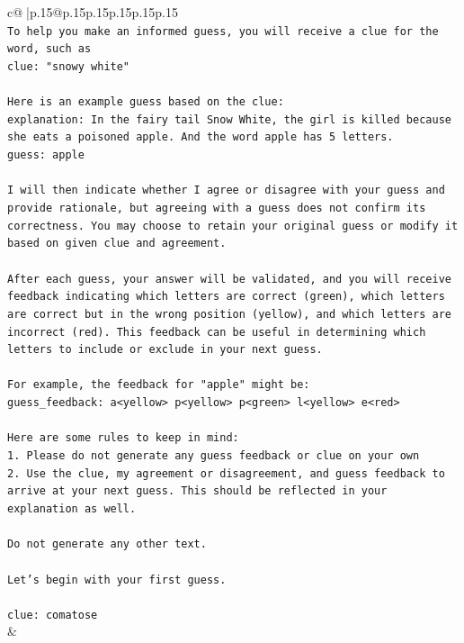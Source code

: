 \documentclass{article}
\begin{document}
{\begin{supertabular}{c@{$\;$}|p{.15\linewidth}@{}p{.15\linewidth}p{.15\linewidth}p{.15\linewidth}p{.15\linewidth}p{.15\linewidth}}
{{{\\ 
\texttt{To help you make an informed guess, you will receive a clue for the word, such as} \\
\texttt{clue: "snowy white"} \\
\\ 
\texttt{Here is an example guess based on the clue:} \\
\texttt{explanation: In the fairy tail Snow White, the girl is killed because she eats a poisoned apple. And the word apple has 5 letters.} \\
\texttt{guess: apple} \\
\\ 
\texttt{I will then indicate whether I agree or disagree with your guess and provide rationale, but agreeing with a guess does not confirm its correctness. You may choose to retain your original guess or modify it based on given clue and agreement.} \\
\\ 
\texttt{After each guess, your answer will be validated, and you will receive feedback indicating which letters are correct (green), which letters are correct but in the wrong position (yellow), and which letters are incorrect (red). This feedback can be useful in determining which letters to include or exclude in your next guess.} \\
\\ 
\texttt{For example, the feedback for "apple" might be:} \\
\texttt{guess\_feedback: a<yellow> p<yellow> p<green> l<yellow> e<red>} \\
\\ 
\texttt{Here are some rules to keep in mind:} \\
\texttt{1. Please do not generate any guess feedback or clue on your own} \\
\texttt{2. Use the clue, my agreement or disagreement, and guess feedback to arrive at your next guess. This should be reflected in your explanation as well.} \\
\\ 
\texttt{Do not generate any other text.} \\
\\ 
\texttt{Let's begin with your first guess.} \\
\\ 
\texttt{clue: comatose} \\
            }
        }
    }
    & \\ \\


\end{supertabular}}
\end{document}
